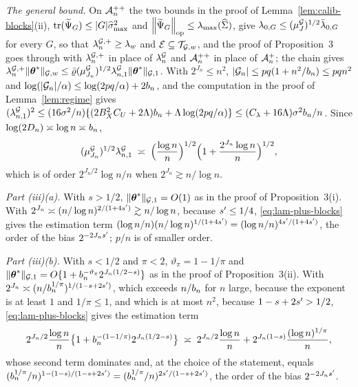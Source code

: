 \emph{The general bound.} On $\mathcal{A}_{n}^{++}$ the two bounds in the proof of
Lemma~\ref{lem:calib-blocks}(ii), $\mathrm{tr}(\widetilde{\Psi}_{G}) \le |G|\widehat{\sigma}_{\max}^{2}$
and $\left\lVert \widetilde{\Psi}_{G} \right\rVert_{\mathrm{op}} \le \lambda_{\max}(\widehat{\Sigma})$, give
$\lambda_{0,G} \le (\mu^{\mathcal{G}}_{J})^{1/2}\bar{\lambda}_{0,G}$ for every $G$, so that
$\lambda^{\mathcal{G},+}_{n} \ge \lambda_{w}$ and $\mathcal{E} \subseteq \mathcal{T}_{\mathcal{G},w}$, and the proof of
Proposition~3 goes through with $\lambda^{\mathcal{G},+}_{n}$ in place of $\lambda^{\mathcal{G}}_{n}$ and $\mathcal{A}_{n}^{++}$
in place of $\mathcal{A}_{n}^{+}$; the chain gives
$\lambda^{\mathcal{G},+}_{n}\lVert \boldsymbol{\theta}^{*}\rVert_{\mathcal{G},w} \le \bar\varrho(\mu^{\mathcal{G}}_{J_n})^{1/2}
\lambda^{\mathcal{G}}_{n,1}\lVert \boldsymbol{\theta}^{*}\rVert_{\mathcal{G},1}$. With $2^{J_n} \le n^{2}$,
$|\mathcal{G}_{n}| \le pq(1 + n^{2}/b_{n}) \le pqn^{2}$ and
$\log(|\mathcal{G}_{n}|/\alpha) \le \log(2pq/\alpha) + 2b_{n}$, and the computation in
the proof of Lemma~\ref{lem:regime} gives
$(\lambda^{\mathcal{G}}_{n,1})^{2} \le (16\sigma^{2}/n)\{(2B_X^{2}C_U + 2\Lambda)b_{n} +
\Lambda\log(2pq/\alpha)\} \le (C_{\lambda} + 16\Lambda)\sigma^{2}b_{n}/n$. Since
$\log(2D_n) \asymp \log n \asymp b_{n}$,
\begin{equation}
  \label{eq:lam-plus-blocks}
  (\mu^{\mathcal{G}}_{J_n})^{1/2}\lambda^{\mathcal{G}}_{n,1} \;\asymp\;
  \Bigl(\frac{\log n}{n}\Bigr)^{1/2}
  \Bigl(1 + \frac{2^{J_n}\log n}{n}\Bigr)^{1/2},
\end{equation}
which is of order $2^{J_n/2}\log n/n$ when $2^{J_n} \gtrsim n/\log n$.

\emph{Part (iii)(a).} With $s > 1/2$, $\lVert \boldsymbol{\theta}^{*}\rVert_{\mathcal{G},1} = O(1)$ as in the
proof of Proposition~3(i). With
$2^{J_n} \asymp (n/\log n)^{2/(1+4s')} \gtrsim n/\log n$, because
$s' \le 1/4$, \eqref{eq:lam-plus-blocks} gives the estimation term
$(\log n/n)(n/\log n)^{1/(1+4s')} = (\log n/n)^{4s'/(1+4s')}$, the
order of the bias $2^{-2J_ns'}$; $p/n$ is of smaller order.

\emph{Part (iii)(b).} With $s < 1/2$ and $\pi < 2$,
$\vartheta_{\pi} = 1 - 1/\pi$ and
$\lVert \boldsymbol{\theta}^{*}\rVert_{\mathcal{G},1} = O\{1 + b_{n}^{-\vartheta_{\pi}}2^{J_n(1/2-s)}\}$ as in the
proof of Proposition~3(ii). With
$2^{J_n} \asymp (n/b_{n}^{1/\pi})^{1/(1-s+2s')}$, which exceeds $n/b_{n}$ for
$n$ large, because the exponent is at least $1$ and $1/\pi \le 1$, and which is
at most $n^{2}$, because $1-s+2s' > 1/2$, \eqref{eq:lam-plus-blocks} gives
the estimation term
\[
  2^{J_n/2}\frac{\log n}{n}\bigl\{1 + b_{n}^{-(1-1/\pi)}2^{J_n(1/2-s)}\bigr\}
  \;\asymp\; 2^{J_n/2}\frac{\log n}{n} +
  2^{J_n(1-s)}\frac{(\log n)^{1/\pi}}{n},
\]
whose second term dominates and, at the choice of the statement, equals
$(b_{n}^{1/\pi}/n)^{1-(1-s)/(1-s+2s')} =
(b_{n}^{1/\pi}/n)^{2s'/(1-s+2s')}$, the order of the bias
$2^{-2J_ns'}$.

